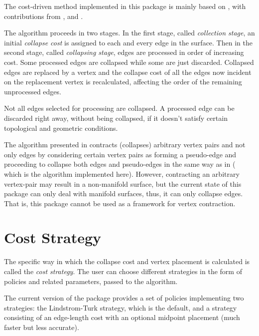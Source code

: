 The cost-driven method implemented in this package is mainly based on \cite{cgal:lt-fmeps-98,cgal:lt-ems-99}, with contributions from \cite{hddms-mo-93}, \cite{gh-ssqem-97}
and \cite{degn-tpec-98}.

The algorithm proceeds in two stages. In the first stage, called {\em collection stage}, 
an initial {\em collapse cost} is assigned to each and every edge in the surface.
Then in the second stage, called {\em collapsing stage}, edges are 
processed in order of increasing cost. Some processed edges are collapsed 
while some are just discarded. Collapsed edges are replaced by a vertex and the collapse 
cost of all the edges now incident on the replacement vertex is recalculated, affecting 
the order of the remaining unprocessed edges.

Not all edges selected for processing are collapsed. A processed edge can be discarded 
right away, without being collapsed, if it doesn't satisfy certain topological
and geometric conditions.

The algorithm presented in \cite{gh-ssqem-97} contracts (collapses) arbitrary vertex pairs and not 
only edges by considering certain vertex pairs as forming a pseudo-edge and proceeding to collapse
both edges and pseudo-edges in the same way as in \cite{cgal:lt-fmeps-98,cgal:lt-ems-99} ( 
which is the algorithm implemented here). However, contracting an arbitrary vertex-pair may result in a non-manifold surface, but the current state of this package can only deal with manifold surfaces, thus, it can only collapse edges. That is, this package cannot be used as a framework for vertex contraction.

\section{Cost Strategy}

The specific way in which the collapse cost and vertex placement is
calculated is called the {\em cost strategy}. The user can choose 
different strategies in the form of policies and related parameters,
passed to the algorithm.
 
The current version of the package provides a set of policies implementing
two strategies: the Lindstrom-Turk strategy, which is the default, and 
a strategy consisting of an edge-length cost with an optional
midpoint placement (much faster but less accurate).

